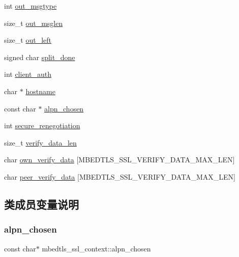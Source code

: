 \begin{DoxyCompactItemize}
\item 
int \hyperlink{structmbedtls__ssl__context_a847547cec75d00533c8c0373f6eaa759}{out\+\_\+msgtype}
\item 
size\+\_\+t \hyperlink{structmbedtls__ssl__context_aa004c925da73e2536e74ce8d36aefcb0}{out\+\_\+msglen}
\item 
size\+\_\+t \hyperlink{structmbedtls__ssl__context_a8b9ef7c3cfd17efdc2eacddf4dbfb409}{out\+\_\+left}
\item 
signed char \hyperlink{structmbedtls__ssl__context_a0b9cdd63126690b0071c5b1821153a5a}{split\+\_\+done}
\item 
int \hyperlink{structmbedtls__ssl__context_aac814a12725174dd9da1b1815b0abac0}{client\+\_\+auth}
\item 
char $\ast$ \hyperlink{structmbedtls__ssl__context_a32d4187f88ff6a5153cfd85c6a752cb9}{hostname}
\item 
const char $\ast$ \hyperlink{structmbedtls__ssl__context_a858fd8077042db3804cd2e4aef9e2f20}{alpn\+\_\+chosen}
\item 
int \hyperlink{structmbedtls__ssl__context_ad7865b811cb03e5f4327102d555769d1}{secure\+\_\+renegotiation}
\item 
size\+\_\+t \hyperlink{structmbedtls__ssl__context_a06b667bf3672f8d480f962970c5adc7d}{verify\+\_\+data\+\_\+len}
\item 
char \hyperlink{structmbedtls__ssl__context_a55b04578ece6b1621c8f1629481506f1}{own\+\_\+verify\+\_\+data} \mbox{[}M\+B\+E\+D\+T\+L\+S\+\_\+\+S\+S\+L\+\_\+\+V\+E\+R\+I\+F\+Y\+\_\+\+D\+A\+T\+A\+\_\+\+M\+A\+X\+\_\+\+L\+EN\mbox{]}
\item 
char \hyperlink{structmbedtls__ssl__context_a75c8c793f5cff7b0892f0616a40cede7}{peer\+\_\+verify\+\_\+data} \mbox{[}M\+B\+E\+D\+T\+L\+S\+\_\+\+S\+S\+L\+\_\+\+V\+E\+R\+I\+F\+Y\+\_\+\+D\+A\+T\+A\+\_\+\+M\+A\+X\+\_\+\+L\+EN\mbox{]}
\end{DoxyCompactItemize}


\subsection{类成员变量说明}
\mbox{\label{structmbedtls__ssl__context_a858fd8077042db3804cd2e4aef9e2f20}} 
\subsubsection{\texorpdfstring{alpn\+\_\+chosen}{alpn\_chosen}}
{\footnotesize\ttfamily const char$\ast$ mbedtls\+\_\+ssl\+\_\+context\+::alpn\+\_\+chosen}

